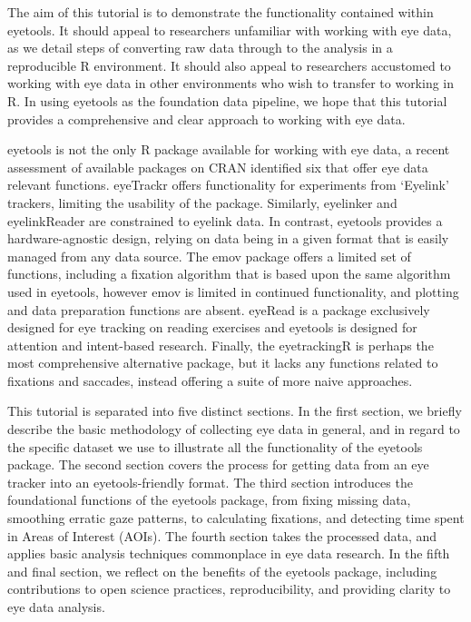 \documentclass[
  man,
  floatsintext,
  longtable,
  nolmodern,
  notxfonts,
  notimes,
  colorlinks=true,linkcolor=blue,citecolor=blue,urlcolor=blue]{apa7}
\begin{document}
The aim of this tutorial is to demonstrate the functionality contained
within eyetools. It should appeal to researchers unfamiliar with working
with eye data, as we detail steps of converting raw data through to the
analysis in a reproducible R environment. It should also appeal to
researchers accustomed to working with eye data in other environments
who wish to transfer to working in R. In using eyetools as the
foundation data pipeline, we hope that this tutorial provides a
comprehensive and clear approach to working with eye data.

eyetools is not the only R package available for working with eye data,
a recent assessment of available packages on CRAN identified six that
offer eye data relevant functions. eyeTrackr offers functionality for
experiments from `Eyelink' trackers, limiting the usability of the
package. Similarly, eyelinker and eyelinkReader are constrained to
eyelink data. In contrast, eyetools provides a hardware-agnostic design,
relying on data being in a given format that is easily managed from any
data source. The emov package offers a limited set of functions,
including a fixation algorithm that is based upon the same algorithm
used in eyetools, however emov is limited in continued functionality,
and plotting and data preparation functions are absent. eyeRead is a
package exclusively designed for eye tracking on reading exercises and
eyetools is designed for attention and intent-based research. Finally,
the eyetrackingR is perhaps the most comprehensive alternative package,
but it lacks any functions related to fixations and saccades, instead
offering a suite of more naive approaches.

This tutorial is separated into five distinct sections. In the first
section, we briefly describe the basic methodology of collecting eye
data in general, and in regard to the specific dataset we use to
illustrate all the functionality of the eyetools package. The second
section covers the process for getting data from an eye tracker into an
eyetools-friendly format. The third section introduces the foundational
functions of the eyetools package, from fixing missing data, smoothing
erratic gaze patterns, to calculating fixations, and detecting time
spent in Areas of Interest (AOIs). The fourth section takes the
processed data, and applies basic analysis techniques commonplace in eye
data research. In the fifth and final section, we reflect on the
benefits of the eyetools package, including contributions to open
science practices, reproducibility, and providing clarity to eye data
analysis.
\end{document}
